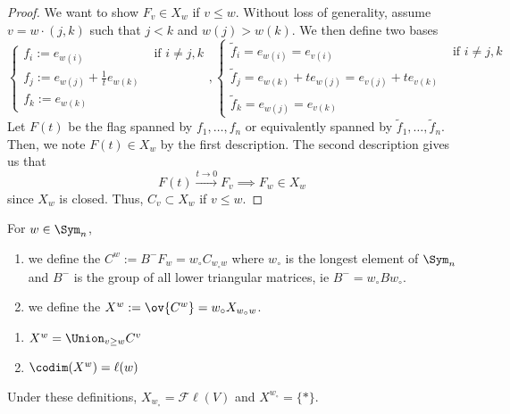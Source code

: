 \documentclass[11pt,leqno,oneside]{amsbook}
\numberwithin{thm}{section}
\newcommand{\Fl}{\mathcal{F\ell}}
\begin{document}
\begin{proof}
  We want to show \(F_v \in X_w\) if \(v \leq w\). Without loss of
  generality, assume \(v = w \cdot (j,k)\) such that \(j < k\) and
  \(w(j) > w(k)\). We then define two bases \[
    \begin{cases}
      f_i := e_{w(i)} & \text{ if }i\neq j,k\\
      f_j := e_{w(j)} + \frac{1}{t} e_{w(k)} \\
      f_k := e_{w(k)}
    \end{cases},
    \begin{cases}
      \tilde{f}_i = e_{w(i)} = e_{v(i)} & \text{ if } i \neq j,k\\
      \tilde{f}_j = e_{w(k)} + t e_{w(j)} = e_{v(j)} + t e_{v(k)} \\
      \tilde{f}_k = e_{w(j)} = e_{v(k)}
    \end{cases}
  \]
  Let \(F(t)\) be the flag spanned by \(f_1, \ldots,
  f_n\) or equivalently spanned by \(\tilde{f}_1, \ldots,
  \tilde{f}_n\). Then, we note \(F(t) \in X_w\) by the first
  description. The second description gives us that \[
    F(t) \overset{t \to 0}{\longrightarrow} F_v \implies F_w \in X_w
  \]
  since \(X_w\) is closed. Thus, \(C_v \subset X_w\) if \(v \leq w\).

\end{proof}
\begin{defn}
  For \(w \in \Sym_n\),
  \begin{enumerate}
  \item we define the 
    \(C^w := B^- F_w = w_\circ C_{w_\circ w}\) where \(w_\circ\) is
    the longest element of \(\Sym_n\) and \(B^-\) is the group of all
    lower triangular matrices, ie \(B^- = w_\circ B w_\circ\).
  \item we define the  \(X^w := \ov{C^w}
    = w_\circ X_{w_\circ w}\).
  \end{enumerate}
\end{defn}
\begin{cor}
  \begin{enumerate}
  \item \(X^w = \Union_{v \geq w} C^v\)
  \item \(\codim(X^w) = \ell(w)\)
  \end{enumerate}
\end{cor}
\begin{rmk}
  Under these definitions, \(X_{w_\circ} = \Fl(V)\) and \(X^{w_\circ}
  = \{*\}\). 
\end{rmk}
\end{document}
